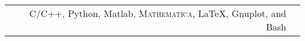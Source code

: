 \renewcommand{\arraystretch}{1.1}

	\begin{tabular}{>{}r>{}p{13cm}} 
		C/C++, Python, Matlab, \textsc{Mathematica}, \LaTeX, Gnuplot, and Bash
	\end{tabular}